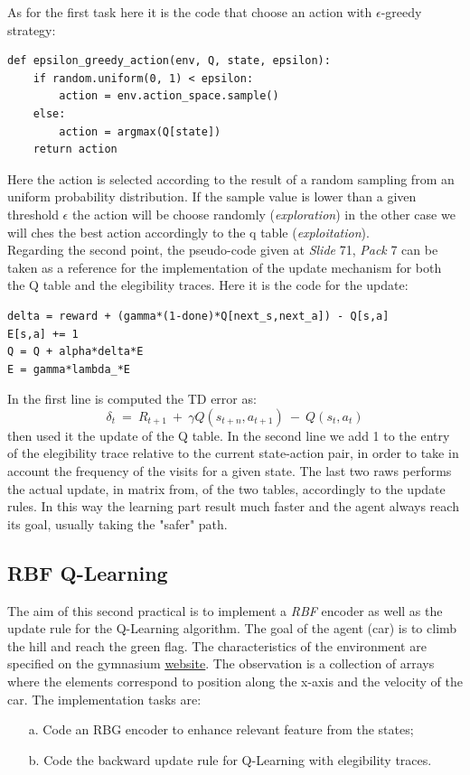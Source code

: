 \documentclass[10pt,a4paper]{article}
\begin{document}
\noindent As for the first task here it is the code that choose an action with $\epsilon$-greedy strategy:
\begin{lstlisting}
def epsilon_greedy_action(env, Q, state, epsilon):
    if random.uniform(0, 1) < epsilon:
        action = env.action_space.sample()  
    else:
        action = argmax(Q[state])
    return action
\end{lstlisting}
\vspace{5pt}

\noindent Here the action is selected according to the result of a random sampling from an uniform probability distribution. If the sample value is lower than a given threshold $\epsilon$ the action will be choose randomly (\textit{exploration}) in the other case we will ches the best action accordingly to the q table (\textit{exploitation}).\\

\noindent Regarding the second point, the pseudo-code given at \textit{Slide} 71, \textit{Pack} 7 can be taken as a reference for the implementation of the update mechanism for both the Q table and the elegibility traces. Here it is the code for the update:
\begin{lstlisting}
delta = reward + (gamma*(1-done)*Q[next_s,next_a]) - Q[s,a]
E[s,a] += 1
Q = Q + alpha*delta*E
E = gamma*lambda_*E
\end{lstlisting}
In the first line is computed the TD error as: 
\begin{equation}
    \delta_t  \:=\: R_{t+1} \:+\: \gamma Q(s_{t+n}, a_{t+1}) \:-\: Q(s_t, a_t)
\end{equation}
then used it the update of the Q table. In the second line we add 1 to the entry of the elegibility trace relative to the current state-action pair, in order to take in account the frequency of the visits for a given state. The last two raws performs the actual update, in matrix from, of the two tables, accordingly to the update rules. In this way the learning part result much faster and the agent always reach its goal, usually taking the "safer" path.
\newpage
\subsection{RBF Q-Learning}
The aim of this second practical is to implement a \textit{RBF} encoder as well as the update rule for the Q-Learning algorithm. The goal of the agent (car) is to climb the hill and reach the green flag. The characteristics of the environment are specified on the gymnasium \href{https://gymnasium.farama.org/environments/classic_control/mountain_car/}{\underline{website}}. The observation is a collection of arrays where the elements correspond to position  along the x-axis and the velocity of the car.
 The implementation tasks are:
\begin{itemize}
    \item[a.] Code an RBG encoder to enhance relevant feature from the states;
    \item[b.] Code the backward update rule for Q-Learning with elegibility traces.
\end{itemize}
\end{document}
